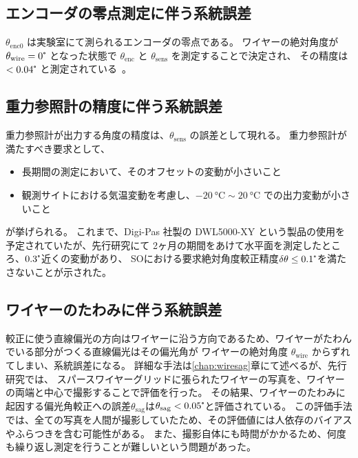 \documentclass[../../main.tex]{subfiles}
\begin{document}
\subsection{エンコーダの零点測定に伴う系統誤差}
$\theta_{\mathrm{enc}0}$ は実験室にて測られるエンコーダの零点である。
ワイヤーの絶対角度が $\theta_{\mathrm{wire}} = 0\tcdegree$ となった状態で $\theta_{\mathrm{enc}}$ と $\theta_{\mathrm{sens}}$ を測定することで決定され、
その精度は $< 0.04\tcdegree$ と測定されている~\cite{swg:iijima}。\\

\subsection{重力参照計の精度に伴う系統誤差}
重力参照計が出力する角度の精度は、$\theta_{\mathrm{sens}}$ の誤差として現れる。
重力参照計が満たすべき要求として、
\begin{itemize}
    \item 長期間の測定において、そのオフセットの変動が小さいこと
    \item 観測サイトにおける気温変動を考慮し、$\SI{-20}{\degreeCelsius}\sim\SI{20}{\degreeCelsius}$ での出力変動が小さいこと
\end{itemize}
が挙げられる。
これまで、Digi-Pas 社製の DWL5000-XY という製品の使用を予定されていたが、先行研究\cite{swg:iijima}にて
2ヶ月の期間をあけて水平面を測定したところ、$0.3\tcdegree$近くの変動があり、
SOにおける要求絶対角度較正精度$\delta\theta \leq 0.1\tcdegree$を満たさないことが示された。

\subsection{ワイヤーのたわみに伴う系統誤差}
\label{subsec:wg_wiresag}
較正に使う直線偏光の方向はワイヤーに沿う方向であるため、ワイヤーがたわんでいる部分がつくる直線偏光はその偏光角が
ワイヤーの絶対角度 $\theta_{\mathrm{wire}}$ からずれてしまい、系統誤差になる。
詳細な手法は\ref{chap:wiresag}章にて述べるが、先行研究\cite{swg:murata}\cite{swg:iijima}では、
スパースワイヤーグリッドに張られたワイヤーの写真を、ワイヤーの両端と中心で撮影することで評価を行った。
その結果、ワイヤーのたわみに起因する偏光角較正への誤差$\theta_{\mathrm{sag}}$は$\theta_{\mathrm{sag}}<0.05\tcdegree$と評価されている。
この評価手法では、全ての写真を人間が撮影していたため、その評価値には人依存のバイアスやふらつきを含む可能性がある。
また、撮影自体にも時間がかかるため、何度も繰り返し測定を行うことが難しいという問題があった。
\end{document}
